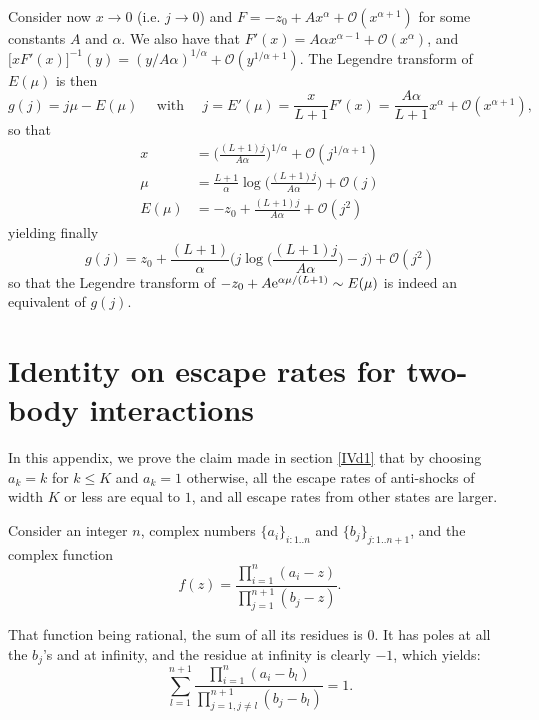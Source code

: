 \documentclass[aps,pre,onecolumn,showpacs,showkeys,a4paper]{revtex4-1}
\begin{document}
~~

Consider now $x\rightarrow 0$ (i.e. $j\rightarrow 0$) and $F=-z_0+ Ax^{\alpha}+\mathcal{O}(x^{\alpha+1})$ for some constants $A$ and $\alpha$. We also have that $F'(x)= A\alpha x^{\alpha-1}+\mathcal{O}(x^{\alpha})$, and $\bigl[xF'(x)\bigr]^{-1}(y)=(y/A\alpha)^{1/\alpha}+\mathcal{O}(y^{1/\alpha+1})$. The Legendre transform of $E(\mu)$ is then
\begin{equation}
g(j)=j\mu-E(\mu)~~~~~~\mathrm{with}~~~~~~ j=E'(\mu)=\frac{x}{L+1}F'(x)= \frac{A\alpha}{L+1} x^{\alpha}+\mathcal{O}(x^{\alpha+1}),
\end{equation}
so that
\begin{align}
x&= \biggl(\frac{(L+1)j}{A\alpha}\biggr)^{1/\alpha}+\mathcal{O}(j^{1/\alpha+1})\\
\mu&=\frac{L+1}{\alpha}\log\biggl(\frac{(L+1)j}{A\alpha}\biggr)+\mathcal{O}(j)\\
E(\mu)&=-z_0+\frac{(L+1)j}{A\alpha}+\mathcal{O}(j^2)
\end{align}
yielding finally
\begin{equation}
g(j)=z_0+ \frac{(L+1)}{\alpha}\Biggl(j\log\biggl(\frac{(L+1)j}{A\alpha}\biggr)-j\Biggr)+\mathcal{O}(j^2)
\end{equation}
so that the Legendre transform of $-z_0+A{\rm e}^{\alpha\mu/(L+1)}\sim E(\mu)$ is indeed an equivalent of $g(j)$.


\section{Identity on escape rates for two-body interactions}
\label{A2}

In this appendix, we prove the claim made in section \ref{IVd1} that by choosing $a_k=k$ for $k\leq K$ and $a_k=1$ otherwise, all the escape rates of anti-shocks of width $K$ or less are equal to $1$, and all escape rates from other states are larger.

Consider an integer $n$, complex numbers $\{a_i\}_{i:1..n}$ and $\{b_j\}_{j:1..n+1}$, and the complex function
\begin{equation}
f(z)=\frac{\prod\limits_{i=1}^{n}(a_i-z)}{\prod\limits_{j=1}^{n+1}(b_j-z)}.
\end{equation}

That function being rational, the sum of all its residues is $0$. It has poles at all the $b_j$'s and at infinity, and the residue at infinity is clearly $-1$, which yields:
\begin{equation}
\sum\limits_{l=1}^{n+1}\frac{\prod\limits_{i=1}^{n}(a_i-b_l)}{\prod\limits_{j=1,j\neq l}^{n+1}(b_j-b_l)}=1.
\end{equation}
\end{document}
